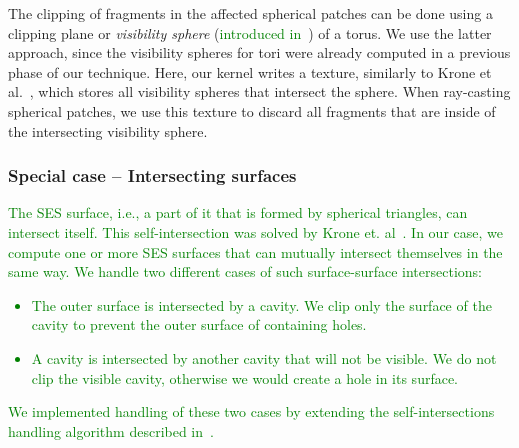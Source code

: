 The clipping of fragments in the affected spherical patches can be done using a clipping plane or \textit{visibility sphere} (\textcolor{green}{introduced in~\cite{krone2009interactive}}) of a torus.
We use the latter approach, since the visibility spheres for tori were already computed in a previous phase of our technique.
Here, our kernel writes a texture, similarly to Krone et al.~\cite{krone2011parallel}, which stores all visibility spheres that intersect the sphere.
When ray-casting spherical patches, we use this texture to discard all fragments that are inside of the intersecting visibility sphere.

\subsubsection{Special case -- Intersecting surfaces}
\label{sec:intersecting}

\textcolor{green}{
The SES surface, i.e., a part of it that is formed by spherical triangles, can intersect itself.
This self-intersection was solved by Krone et. al~\cite{krone2009interactive}.
In our case, we compute one or more SES surfaces that can mutually intersect themselves in the same way.
We handle two different cases of such surface-surface intersections:
\begin{itemize}
	\item The outer surface is intersected by a cavity. We clip only the surface of the cavity to prevent the outer surface of containing holes.
	\item A cavity is intersected by another cavity that will not be visible. We do not clip the visible cavity, otherwise we would create a hole in its surface.
\end{itemize}
We implemented handling of these two cases by extending the self-intersections handling algorithm described in~\cite{krone2011parallel}.
}